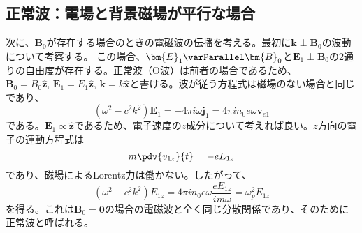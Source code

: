 \subsection{正常波：電場と背景磁場が平行な場合}
次に、$\bm{B}_0$が存在する場合のときの電磁波の伝播を考える。最初に$\bm{k}\perp\bm{B}_0$の波動について考察する。
この場合、$\bm{E}_1\varParallel \bm{B}_0$と$\bm{E}_1\perp \bm{B}_0$の2通りの自由度が存在する。正常波（O波）は前者の場合であるため、
$\bm{B}_0 = B_0\hat{\bm{z}},\,\bm{E}_1 = E_1\hat{\bm{z}},\,\bm{k} = k\hat{\bm{x}}$と書ける。波が従う方程式は磁場のない場合と同じであり、
\begin{equation}
	(\omega^2-c^2k^2)\bm{E}_1 = -4\pi{}i\omega{}\bm{j}_1 = 4\pi{}in_0e\omega\bm{v}_{e1}
\end{equation}
である。$\bm{E}_1 \propto\hat{\bm{z}}$であるため、電子速度の$z$成分について考えれば良い。$z$方向の電子の運動方程式は
\begin{equation}
	m\pdv{v_{1z}}{t} = -eE_{1z}
\end{equation}
であり、磁場によるLorentz力は働かない。したがって、
\begin{equation}
	(\omega^2 - c^2k^2)E_{1z} = 4\pi{}in_0e\omega\frac{eE_{1z}}{im\omega} = \omega^2_pE_{1z}
\end{equation}
を得る。これは$\bm{B}_0 = \bm{0}$の場合の電磁波と全く同じ分散関係であり、そのために正常波と呼ばれる。

